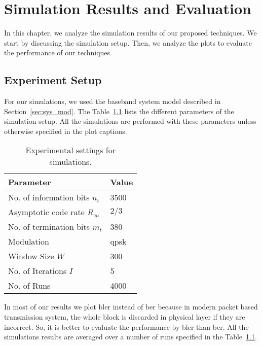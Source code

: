 \chapter{Simulation Results and Evaluation}\label{ch:simulation}
In this chapter, we analyze the simulation results of our proposed techniques. We start by discussing the simulation setup. Then, we analyze the plots to evaluate the performance of our techniques.

\section{Experiment Setup}
For our simulations, we used the baseband system model described in Section~\ref{sec:sys_mod}. The Table~\ref{tab:sim_param} lists the different parameters of the simulation setup. All the simulations are performed with these parameters unless otherwise specified in the plot captions.
\begin{table}[htbp]
\centering
\begin{tabular}{|l|l|}
  \hline
  \textbf{Parameter} &\textbf{Value}\\
  \hline
  \hline
  No. of information bits $n_i$ &3500\\
  \hline
  Asymptotic code rate $R_\infty$ &$2/3$\\
  \hline
  No. of termination bits $m_t$ &380\\
  \hline
  Modulation &\gls{qpsk}\\
  \hline
  Window Size $W$ &300\\
  \hline
  No. of Iterations $I$ &5\\
  \hline
  No. of Runs &4000\\
  \hline
\end{tabular}
\caption{Experimental settings for simulations.}
\label{tab:sim_param}
\end{table}

In most of our results we plot \gls{bler} instead of \gls{ber} because in modern packet based transmission system, the whole block is discarded in physical layer if they are incorrect. So, it is better to evaluate the performance by \gls{bler} than \gls{ber}. All the simulations results are averaged over a number of runs specified in the Table~\ref{tab:sim_param}.
